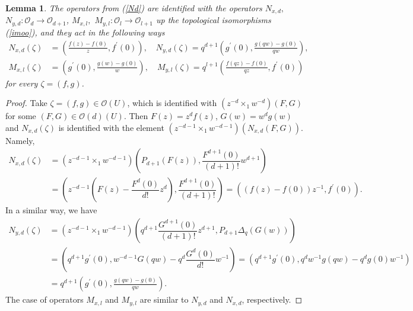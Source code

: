 \documentclass[12pt,reqno]{amsart}%
\theoremstyle{plain}
\newtheorem{lemma}{Lemma}
\numberwithin{theorem}{section} \numberwithin{equation}{section}
\numberwithin{lemma}{section}
\numberwithin{remark}{section}
\numberwithin{example}{section}
\numberwithin{proposition}{section}
\numberwithin{definition}{section}
\numberwithin{corollary}{section}
\begin{document}
\begin{lemma}
\label{lemTech1}The operators from (\ref{Nd}) are identified with the
operators $N_{x,d},$ $N_{y,d}:\mathcal{O}_{d}\rightarrow\mathcal{O}_{d+1}$,
$M_{x,l},$ $M_{y,l}:\mathcal{O}_{l}\rightarrow\mathcal{O}_{l+1}$ up the
topological isomorphisms (\ref{imoo}), and they act in the following ways
\begin{align*}
N_{x,d}\left(  \zeta\right)   &  =\left(  \frac{f\left(  z\right)  -f\left(
0\right)  }{z},f^{\prime}\left(  0\right)  \right)  ,\quad N_{y,d}\left(
\zeta\right)  =q^{d+1}\left(  g^{\prime}\left(  0\right)  ,\frac{g\left(
qw\right)  -g\left(  0\right)  }{qw}\right)  ,\\
M_{x,l}\left(  \zeta\right)   &  =\left(  g^{\prime}\left(  0\right)
,\frac{g\left(  w\right)  -g\left(  0\right)  }{w}\right)  ,\quad
M_{y,l}\left(  \zeta\right)  =q^{l+1}\left(  \frac{f\left(  qz\right)
-f\left(  0\right)  }{qz},f^{\prime}\left(  0\right)  \right)
\end{align*}
for every $\zeta=\left(  f,g\right)  $.
\end{lemma}

\begin{proof}
Take $\zeta=\left(  f,g\right)  \in\mathcal{O}\left(  U\right)  $, which is
identified with $\left(  z^{-d}\times_{1}w^{-d}\right)  \left(  F,G\right)  $
for some $\left(  F,G\right)  \in\mathcal{O}\left(  d\right)  \left(
U\right)  $. Then $F\left(  z\right)  =z^{d}f\left(  z\right)  $, $G\left(
w\right)  =w^{d}g\left(  w\right)  $ and $N_{x,d}\left(  \zeta\right)  $ is
identified with the element $\left(  z^{-d-1}\times_{1}w^{-d-1}\right)
\left(  N_{x,d}\left(  F,G\right)  \right)  $. Namely,
\begin{align*}
N_{x,d}\left(  \zeta\right)   &  =\left(  z^{-d-1}\times_{1}w^{-d-1}\right)
\left(  P_{d+1}\left(  F\left(  z\right)  \right)  ,\dfrac{F^{d+1}\left(
0\right)  }{\left(  d+1\right)  !}w^{d+1}\right) \\
&  =\left(  z^{-d-1}\left(  F\left(  z\right)  -\dfrac{F^{d}\left(  0\right)
}{d!}z^{d}\right)  ,\dfrac{F^{d+1}\left(  0\right)  }{\left(  d+1\right)
!}\right)  =\left(  \left(  f\left(  z\right)  -f\left(  0\right)  \right)
z^{-1},f^{\prime}\left(  0\right)  \right)  .
\end{align*}
In a similar way, we have
\begin{align*}
N_{y,d}\left(  \zeta\right)   &  =\left(  z^{-d-1}\times_{1}w^{-d-1}\right)
\left(  q^{d+1}\dfrac{G^{d+1}\left(  0\right)  }{\left(  d+1\right)  !}%
z^{d+1},P_{d+1}\Delta_{q}\left(  G\left(  w\right)  \right)  \right) \\
&  =\left(  q^{d+1}g^{\prime}\left(  0\right)  ,w^{-d-1}G\left(  qw\right)
-q^{d}\dfrac{G^{d}\left(  0\right)  }{d!}w^{-1}\right)  =\left(
q^{d+1}g^{\prime}\left(  0\right)  ,q^{d}w^{-1}g\left(  qw\right)
-q^{d}g\left(  0\right)  w^{-1}\right) \\
&  =q^{d+1}\left(  g^{\prime}\left(  0\right)  ,\frac{g\left(  qw\right)
-g\left(  0\right)  }{qw}\right)  .
\end{align*}
The case of operators $M_{x,l}$ and $M_{y,l}$ are similar to $N_{y,d}$ and
$N_{x,d}$, respectively.
\end{proof}
\end{document}
